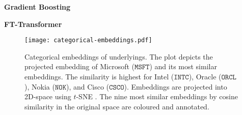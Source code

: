 
\textbf{Gradient Boosting}

\textbf{FT-Transformer}

\begin{figure}[ht]
    \centering
    \texttt{[image: categorical-embeddings.pdf]}
    \caption[Categorical Embeddings of Underlyings]{Categorical embeddings of underlyings. The plot depicts the projected embedding of Microsoft ($\mathtt{MSFT}$) and its most similar embeddings. The similarity is highest for Intel ($\mathtt{INTC}$), Oracle ($\mathtt{ORCL}$), Nokia ($\mathtt{NOK}$), and Cisco ($\mathtt{CSCO}$). Embeddings are projected into 2D-space using $t$-SNE \autocite{vandermaatenVisualizingDataUsing2008}. The nine most similar embeddings by cosine similarity in the original space are coloured and annotated.}
    \label{fig:categorical-embeddings}
\end{figure}

